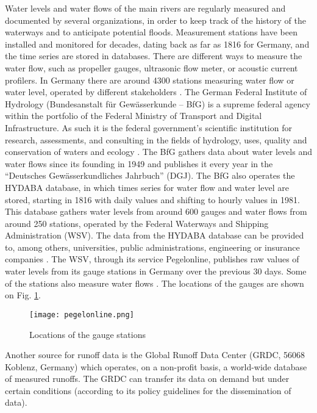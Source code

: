 Water levels and water flows of the main rivers are regularly measured and documented by several organizations, in order to keep track of the history of the waterways and to anticipate potential floods. Measurement stations have been installed and monitored for decades, dating back as far as 1816 for Germany, and the time series are stored in databases. There are different ways to measure the water flow, such as propeller gauges, ultrasonic flow meter, or acoustic current profilers. In Germany there are around 4300 stations measuring water flow or water level, operated by different stakeholders \cite{bafg_hyd}.  The German Federal Institute of Hydrology (Bundesanstalt für Gewässerkunde – BfG) is a supreme federal agency within the portfolio of the Federal Ministry of Transport and Digital Infrastructure. As such it is the federal government's scientific institution for research, assessments, and consulting in the fields of hydrology, uses, quality and conservation of waters and ecology \cite{bafg}. The BfG gathers data about water levels and water flows since its founding in 1949 and publishes it every year in the ``Deutsches Gewässerkundliches Jahrbuch'' (DGJ). The BfG also operates the HYDABA database, in which times series for water flow and water level are stored, starting in 1816 with daily values and shifting to hourly values in 1981. This database gathers water levels from around 600 gauges and water flows from around 250 stations, operated by the Federal Waterways and Shipping Administration (WSV). The data from the HYDABA database can be provided to, among others, universities, public administrations, engineering or insurance companies \cite{bafg_hyd}. \newline
The WSV, through its service Pegelonline, publishes raw values of water levels from its gauge stations in Germany over the previous 30 days. Some of the stations also measure water flows \cite{pegelonline}. The locations of the gauges are shown on Fig. \ref{pegelonline}.

\begin{figure}[H]
\centering
\texttt{[image: pegelonline.png]}
\caption[Locations of the gauge stations]{Locations of the gauge stations \cite{pegelonline}}
\label{pegelonline}
\end{figure}

Another source for runoff data is the Global Runoff Data Center (GRDC, 56068 Koblenz, Germany) which operates, on a non-profit basis, a world-wide database of measured runoffs. The GRDC can transfer its data on demand but under certain conditions (according to its policy guidelines for the dissemination of data).\newline

